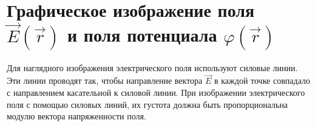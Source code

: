 \section{Графическое изображение поля $\vec{E}(\vec{r})$ и поля потенциала $\varphi(\vec{r})$}

Для наглядного изображения электрического поля используют силовые линии. Эти линии проводят так, чтобы направление вектора $\vec{E}$ в каждой точке совпадало с направлением касательной к силовой линии. При изображении электрического поля с помощью силовых линий, их густота должна быть пропорциональна модулю вектора напряженности поля.